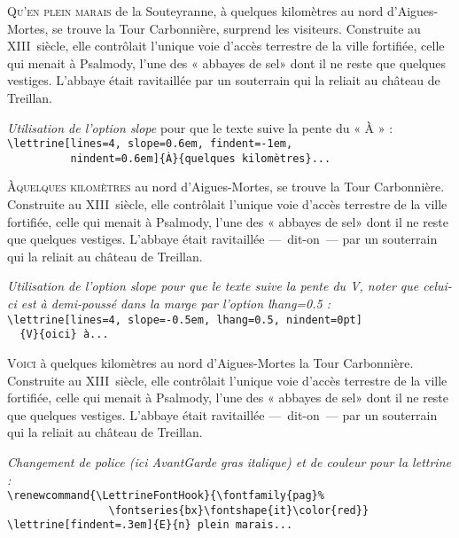 \documentclass[12pt,a4paper]{article}
\begin{document}
\lettrine[lines=4,depth=1]{Q}{u'en plein marais} de la Souteyranne,
à quelques kilomètres au nord d'Aigues-Mortes,
se trouve la Tour Carbonnière, surprend les visiteurs.
Construite au XIII\ieme~siècle, elle contrôlait l'unique voie d'accès
terrestre de la ville fortifiée, celle qui menait à Psalmody,
l'une des « abbayes de sel» dont il ne reste que quelques vestiges.
L'abbaye était ravitaillée par un souterrain qui
la reliait au château de Treillan.

\vspace{.5\baselineskip}
\textit{Utilisation de l'option {\ttfamily\upshape slope}} pour que le texte
suive la pente du « À » :\\
\verb+\lettrine[lines=4, slope=0.6em, findent=-1em,+\\
\verb+          nindent=0.6em]{À}{quelques kilomètres}...+

\lettrine[lines=4, slope=0.6em, findent=-1em, nindent=0.6em]{À} {quelques
kilomètres} au nord d'Aigues-Mortes, se trouve  la Tour Carbonnière.
Construite au XIII\ieme~siècle, elle contrôlait l'unique voie d'accès
terrestre de la ville fortifiée, celle qui menait à Psalmody,
l'une des « abbayes de sel» dont il ne reste que quelques vestiges.
L'abbaye était ravitaillée ---~dit-on~--- par un souterrain qui
la reliait au château de Treillan.

\vspace{.5\baselineskip}
\textit{Utilisation de l'option {\ttfamily\upshape slope} pour que le texte
 suive la pente du {\ttfamily\upshape V}, noter que celui-ci est à
 demi-poussé dans la marge par l'option {\ttfamily\upshape lhang=0.5} :}\\
\verb+\lettrine[lines=4, slope=-0.5em, lhang=0.5, nindent=0pt]+\\
\verb+  {V}{oici} à...+

\lettrine[lines=4, slope=-0.5em, lhang=0.5, nindent=0pt]{V}{oici}
à quelques kilomètres au nord d'Aigues-Mortes la Tour Carbonnière.
Construite au XIII\ieme~siècle, elle contrôlait l'unique voie d'accès
terrestre de la ville fortifiée, celle qui menait à Psalmody,
l'une des « abbayes de sel» dont il ne reste que quelques vestiges.
L'abbaye était ravitaillée ---~dit-on~--- par un souterrain qui
la reliait au château de Treillan.

\vspace{.5\baselineskip}
\textit{Changement de police (ici AvantGarde gras italique)
  et de couleur pour la lettrine :}\\
\verb+\renewcommand{\LettrineFontHook}{\fontfamily{pag}%+\\
\verb+                \fontseries{bx}\fontshape{it}\color{red}}+\\
\verb+\lettrine[findent=.3em]{E}{n} plein marais...+
\end{document}
